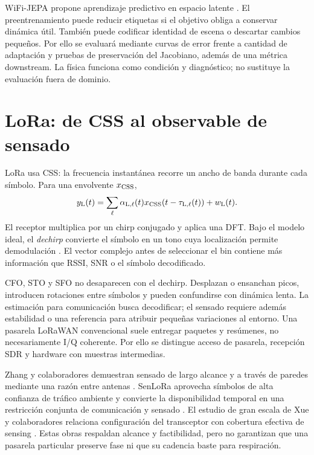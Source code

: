 WiFi-JEPA propone aprendizaje predictivo en espacio latente
\citep{Kim2026WiFiJEPA}. El preentrenamiento puede reducir etiquetas si el objetivo
obliga a conservar dinámica útil. También puede codificar identidad de escena o
descartar cambios pequeños. Por ello se evaluará mediante curvas de error frente
a cantidad de adaptación y pruebas de preservación del Jacobiano, además de una
métrica downstream. La física funciona como condición y diagnóstico; no sustituye
la evaluación fuera de dominio.

\section{LoRa: de CSS al observable de sensado}

LoRa usa \ac{CSS}: la frecuencia instantánea recorre un ancho de banda durante cada
símbolo. Para una envolvente $x_{\rm CSS}$,
\begin{equation}
y_{\rm L}(t)=\sum_{\ell}\alpha_{{\rm L},\ell}(t)
x_{\rm CSS}(t-\tau_{{\rm L},\ell}(t))+w_{\rm L}(t).
\label{eq:lora_channel}
\end{equation}
El receptor multiplica por un chirp conjugado y aplica una DFT. Bajo el modelo
ideal, el \emph{dechirp} convierte el símbolo en un tono cuya localización permite
demodulación \citep{Ghanaatian2019LoRaRx,Maleki2023CSS}. El vector complejo antes
de seleccionar el bin contiene más información que RSSI, SNR o el símbolo
decodificado.

CFO, STO y SFO no desaparecen con el dechirp. Desplazan o ensanchan picos, introducen
rotaciones entre símbolos y pueden confundirse con dinámica lenta. La estimación
para comunicación busca decodificar; el sensado requiere además estabilidad o una
referencia para atribuir pequeñas variaciones al entorno. Una pasarela LoRaWAN
convencional suele entregar paquetes y resúmenes, no necesariamente I/Q coherente.
Por ello se distingue acceso de pasarela, recepción SDR y hardware con muestras
intermedias.

Zhang y colaboradores demuestran sensado de largo alcance y a través de paredes
mediante una razón entre antenas \citep{Zhang2020LoRa}. SenLoRa aprovecha símbolos
de alta confianza de tráfico ambiente y convierte la disponibilidad temporal en
una restricción conjunta de comunicación y sensado \citep{SenLoRa2025}. El estudio
de gran escala de Xue y colaboradores relaciona configuración del transceptor con
cobertura efectiva de sensing \citep{Xue2025LargeScaleLoRa}. Estas obras respaldan
alcance y factibilidad, pero no garantizan que una pasarela particular preserve
fase ni que su cadencia baste para respiración.

